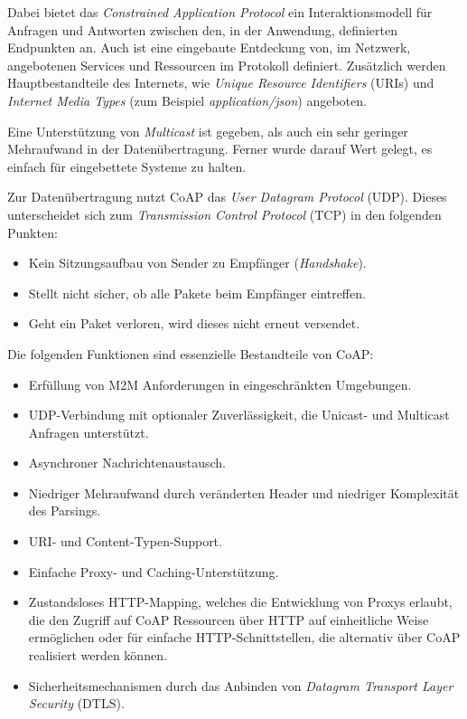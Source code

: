 Dabei bietet das \textit{Constrained Application Protocol} ein Interaktionsmodell für Anfragen und Antworten zwischen den, in der Anwendung, definierten Endpunkten an. Auch ist eine eingebaute Entdeckung von, im Netzwerk, angebotenen Services und Ressourcen im Protokoll definiert. Zusätzlich werden Hauptbestandteile des Internets, wie \textit{Unique Resource Identifiers} (URIs) und \textit{Internet Media Types} (zum Beispiel \textit{application/json}) angeboten.

Eine Unterstützung von \textit{Multicast} ist gegeben, als auch ein sehr geringer Mehraufwand in der Datenübertragung. Ferner wurde darauf Wert gelegt, es einfach für eingebettete Systeme zu halten.

Zur Datenübertragung nutzt CoAP das \textit{User Datagram Protocol} (UDP). Dieses unterscheidet sich zum \textit{Transmission Control Protocol} (TCP) in den folgenden Punkten:
\begin{itemize}
    \item Kein Sitzungsaufbau von Sender zu Empfänger (\textit{Handshake}).
    \item Stellt nicht sicher, ob alle Pakete beim Empfänger eintreffen.
    \item Geht ein Paket verloren, wird dieses nicht erneut versendet.
\end{itemize}

Die folgenden Funktionen sind essenzielle Bestandteile von CoAP:
\begin{itemize}
    \item Erfüllung von M2M Anforderungen in eingeschränkten Umgebungen.
    \item UDP-Verbindung mit optionaler Zuverlässigkeit, die Unicast- und Multicast Anfragen unterstützt.
    \item Asynchroner Nachrichtenaustausch.
    \item Niedriger Mehraufwand durch veränderten Header und niedriger Komplexität des Parsings.
    \item URI- und Content-Typen-Support.
    \item Einfache Proxy- und Caching-Unterstützung.
    \item Zustandsloses HTTP-Mapping, welches die Entwicklung von Proxys erlaubt, die den Zugriff auf CoAP Ressourcen über HTTP auf einheitliche Weise ermöglichen oder für einfache HTTP-Schnittstellen, die alternativ über CoAP realisiert werden können.
    \item Sicherheitsmechanismen durch das Anbinden von \textit{Datagram Transport Layer Security} (DTLS).
\end{itemize}


